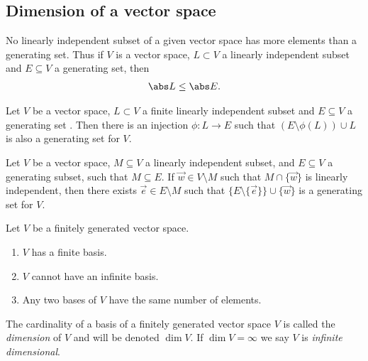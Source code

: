 \documentclass{article}
\begin{document}
\subsection{Dimension of a vector space}

\begin{theorem}
	No linearly independent subset of a given vector space has more elements than
	a generating set. Thus if $V$ is a vector space, $L\subset V$ a linearly independent
	subset and $E\subseteq V$ a generating set, then \begin{align*}
		\abs L \leq \abs E.
	\end{align*}
\end{theorem}

\begin{theorem}
	Let $V$ be a vector space, $L\subset V$ a finite linearly independent subset
	and $E\subseteq V$ a generating set . Then there is an injection $\phi:L\to E$
	such that $(E\setminus\phi(L))\cup L$ is also a generating set for $V$.
\end{theorem}

\begin{lemma}
	Let $V$ be a vector space, $M\subseteq V$ a linearly independent subset, and
	$E\subseteq V$ a generating subset, such that $M\subseteq E$. If $\vec w\in V\setminus M$
	such that $M\cap\{\vec w\}$ is linearly independent, then there exists
	$\vec e\in E\setminus M$ such that $\{E\setminus\{\vec e\}\}\cup \{\vec w\}$ is a
	generating set for $V$.
\end{lemma}

\begin{corollary}[Notes 1.6.4]
	Let $V$ be a finitely generated vector space.
	\begin{enumerate}
		\item $V$ has a finite basis.
		\item $V$ cannot have an infinite basis.
		\item Any two bases of $V$ have the same number of elements.
	\end{enumerate}
\end{corollary}

\begin{definition}
	The cardinality of a basis of a finitely generated vector space $V$
	is called the \emph{dimension} of $V$ and will be denoted $\dim V$.
	If $\dim V=\infty$ we say $V$ is \emph{infinite dimensional}.
\end{definition}
\end{document}
